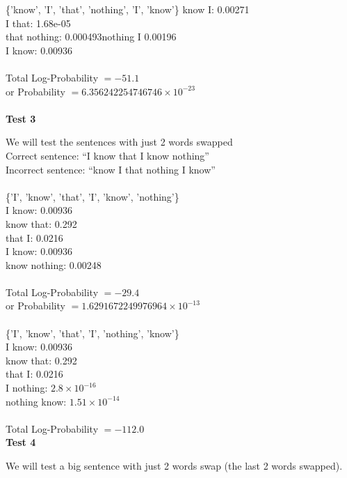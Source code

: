 \documentclass[12pt]{article}
\begin{document}
\{'know', 'I', 'that', 'nothing', 'I', 'know'\}
know I: 0.00271 \\
I that: 1.68e-05 \\
that nothing: 0.000493nothing I 0.00196 \\
I know: 0.00936 \\
\\
Total Log-Probability $= -51.1$ \\
or Probability $= 6.356242254746746 \times 10^{-23}$
\\
\\
\textbf{Test 3}

We will test the sentences with just 2 words swapped
\\

Correct sentence: \enquote{I know that I know nothing} \\
Incorrect sentence: \enquote{know I that nothing I know} \\
\\
\{'I', 'know', 'that', 'I', 'know', 'nothing'\} \\
I know: 0.00936 \\
know that: 0.292 \\
that I: 0.0216 \\
I know: 0.00936 \\
know nothing: 0.00248 \\
\\
Total Log-Probability $= -29.4$ \\
or Probability $= 1.6291672249976964 \times 10^{-13}$ \\
\\
\{'I', 'know', 'that', 'I', 'nothing', 'know'\} \\
I know: 0.00936 \\
know that: 0.292 \\
that I: 0.0216 \\
I nothing: $2.8 \times 10^{-16}$ \\
nothing know: $1.51\times 10^{-14}$ \\
\\
 Total Log-Probability $= -112.0$
 \\
 
\textbf{Test 4}

We will test a big sentence with just 2 words swap (the last 2 words swapped).
\\
\end{document}
